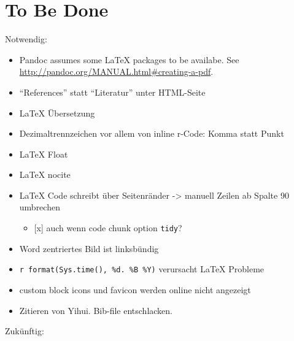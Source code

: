 \documentclass[]{book}
\providecommand{\tightlist}{%
  \setlength{\itemsep}{0pt}\setlength{\parskip}{0pt}}
\theoremstyle{definition}
\theoremstyle{definition}
\theoremstyle{remark}
\begin{document}
\hypertarget{tbd}{\chapter{To Be Done}\label{tbd}}

Notwendig:

\begin{itemize}
\tightlist
\item
  Pandoc assumes some LaTeX packages to be availabe. See
  \url{http://pandoc.org/MANUAL.html\#creating-a-pdf}.
\item
  ``References'' statt ``Literatur'' unter HTML-Seite
\item
  LaTeX Übersetzung
\item
  Dezimaltrennzeichen vor allem von inline r-Code: Komma statt Punkt
\item
  LaTeX Float
\item
  LaTeX nocite
\item
  LaTeX Code schreibt über Seitenränder -\textgreater{} manuell Zeilen
  ab Spalte 90 umbrechen

  \begin{itemize}
  \tightlist
  \item
    {[}x{]} auch wenn code chunk option \texttt{tidy}?
  \end{itemize}
\item
  Word zentriertes Bild ist linksbündig
\item
  \texttt{\textquotesingle{}r\ format(Sys.time(),\ \textquotesingle{}\%d.\ \%B\ \%Y\textquotesingle{})\textquotesingle{}}
  verursacht LaTeX Probleme
\item
  custom block icons und favicon werden online nicht angezeigt
\item
  Zitieren von Yihui. Bib-file entschlacken.
\end{itemize}

Zukünftig:
\end{document}
